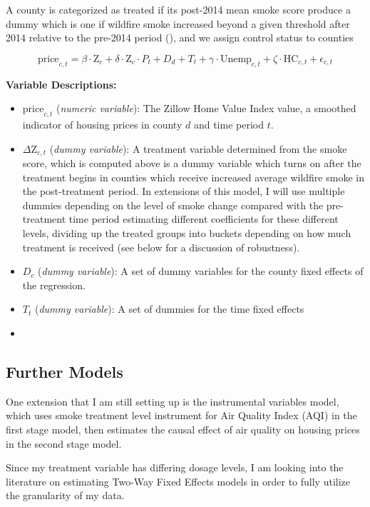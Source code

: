 \documentclass[]{article}
\begin{document}
A county is categorized as treated if its post-2014 mean smoke score
produce a dummy which is one if wildfire smoke increased beyond a given
threshold after 2014 relative to the pre-2014 period (), and we assign
control status to counties

\[
\text{price}_{c,t} = \beta\cdot\text{Z}_{c} +  \delta\cdot\text{Z}_c\cdot P_t+ D_d + T_t +\gamma\cdot\text{Unemp}_{c,t} + \zeta\cdot\text{HC}_{c,t} + \epsilon_{c,t}
\]

\textbf{Variable Descriptions:}

\begin{itemize}
\item $\text{price}_{c,t}$ (\textit{numeric variable}): The Zillow Home Value Index 
value, a smoothed indicator of housing prices in county $d$ and time period $t$.
\item $\Delta\text{Z}_{c,t}$ (\textit{dummy variable}): A treatment variable
determined from the smoke score, which is computed above
is a dummy variable which turns on after the treatment begins in 
counties which receive increased average wildfire smoke in the post-treatment
period.  In extensions of this model, I will use multiple dummies depending on 
the level of smoke change compared with the pre-treatment time period
estimating different coefficients for these different levels, dividing up the 
treated groups into buckets depending on how much treatment is received (see below
for a discussion of robustness).  
\item $D_c$ (\textit{dummy variable}): A set of dummy variables for the county
fixed effects of the regression.  
\item $T_t$ (\textit{dummy variable}): A set of dummies for the time fixed 
effects
\item 
\end{itemize}

\subsection{Further Models}\label{further-models}

One extension that I am still setting up is the instrumental variables
model, which uses smoke treatment level instrument for Air Quality Index
(AQI) in the first stage model, then estimates the causal effect of air
quality on housing prices in the second stage model.

Since my treatment variable has differing dosage levels, I am looking
into the literature on estimating Two-Way Fixed Effects models in order
to fully utilize the granularity of my data.
\end{document}
